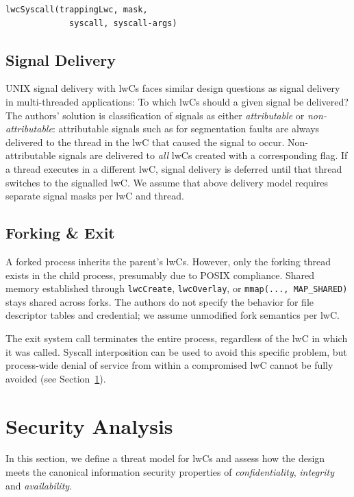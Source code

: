 \documentclass[10pt,twocolumn,a4paper]{article}
\begin{document}
\begin{lstlisting}[style=syscallinline]
  lwcSyscall(trappingLwc, mask,
             syscall, syscall-args)
\end{lstlisting}

\subsection{Signal Delivery}
UNIX signal delivery with lwCs faces similar design questions as signal delivery in multi-threaded applications: To which lwCs should a given signal be delivered?
The authors' solution is classification of signals as either \textit{attributable} or \textit{non-attributable}:
attributable signals such as for segmentation faults are always delivered to the thread in the lwC that caused the signal to occur.
Non-attributable signals are delivered to \textit{all} lwCs created with a corresponding flag.
If a thread executes in a different lwC, signal delivery is deferred until that thread switches to the signalled lwC.
\cite{lwcpaper}
We assume that above delivery model requires separate signal masks per lwC and thread.

\subsection{Forking \& Exit}
A forked process inherits the parent's lwCs.
However, only the forking thread exists in the child process, presumably due to POSIX compliance\cite{forkmultithread}. %
Shared memory established through \lstinline{lwcCreate}, \lstinline{lwcOverlay}, or \lstinline{mmap(..., MAP_SHARED)} stays shared across forks.
The authors do not specify the behavior for file descriptor tables and credential; we assume unmodified fork semantics per lwC.
\cite{lwcpaper}

The exit system call terminates the entire process, regardless of the lwC in which it was called.
Syscall interposition can be used to avoid this specific problem, but process-wide denial of service from within a compromised lwC cannot be fully avoided (see Section~\ref{security}).
\cite{lwcpaper}


\section{Security Analysis}\label{security}

In this section, we define a threat model for lwCs and assess how the design meets the canonical information security properties of \textit{confidentiality}, \textit{integrity} and \textit{availability}\cite{ciagoals}.
\end{document}
